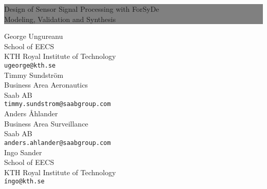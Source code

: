 \begin{titlepage} %
  
  
  \colorbox{grey}{
    \parbox[t]{0.93\textwidth}{ %
      \parbox[t]{0.91\textwidth}{ %
        \raggedleft %
        \fontsize{37pt}{60pt}\selectfont
        \vspace{0.7cm} %
        
        Design of Sensor Signal Processing with ForSyDe\\
        \fontsize{25pt}{60pt}\selectfont
        Modeling, Validation and Synthesis\\
        
        \vspace{0.7cm} %
      }
    }
  }
  
  \vfill %
  
  
  \parbox[t]{0.93\textwidth}{ %
    \raggedleft %
    {\Large George Ungureanu}\\[4pt] %
    School of EECS\\
    KTH Royal Institute of Technology\\[4pt] %
    \texttt{ugeorge@kth.se}\\[20pt]
        {\Large Timmy Sundstr\"{o}m}\\[4pt] %
    Business Area Aeronautics\\
    Saab AB\\[4pt] %
    \texttt{timmy.sundstrom@saabgroup.com}\\[20pt]
        {\Large Anders \r{A}hlander}\\[4pt] %
    Business Area Surveillance\\
    Saab AB\\[4pt] %
    \texttt{anders.ahlander@saabgroup.com}\\[20pt]
        {\Large Ingo Sander}\\[4pt] %
    School of EECS\\
    KTH Royal Institute of Technology\\[4pt] %
    \texttt{íngo@kth.se}\\
    
}
\end{titlepage}
